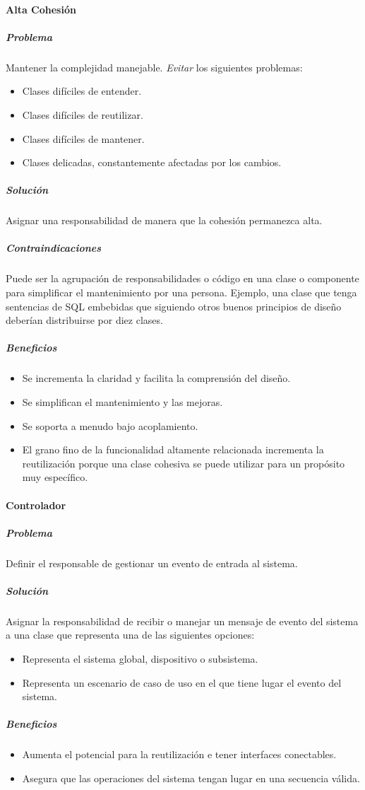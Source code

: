 \paragraph{Alta Cohesión}
\subparagraph{Problema}
Mantener la complejidad manejable. \emph{Evitar} los siguientes problemas:
\begin{itemize}
\item Clases difíciles de entender.
\item Clases difíciles de reutilizar.
\item Clases difíciles de mantener.
\item Clases delicadas, constantemente afectadas por los cambios.
\end{itemize}
\subparagraph{Solución}
Asignar una responsabilidad de manera que la cohesión permanezca alta.
\subparagraph{Contraindicaciones}
Puede ser la agrupación de responsabilidades o código en una clase o componente para simplificar el mantenimiento por una persona. Ejemplo, una clase que tenga sentencias de SQL embebidas que siguiendo otros buenos principios de diseño deberían distribuirse por diez clases.
\subparagraph{Beneficios}
\begin{itemize}
\item Se incrementa la claridad y facilita la comprensión del diseño.
\item Se simplifican el mantenimiento y las mejoras.
\item Se soporta a menudo bajo acoplamiento.
\item El grano fino de la funcionalidad altamente relacionada incrementa la reutilización porque una clase cohesiva se puede utilizar para un propósito muy específico.
\end{itemize}
\paragraph{Controlador}
\subparagraph{Problema}
Definir el responsable de gestionar un evento de entrada al sistema.
\subparagraph{Solución}
Asignar la responsabilidad de recibir o manejar un mensaje de evento del sistema a una clase que representa una de las siguientes opciones:
\begin{itemize}
\item Representa el sistema global, dispositivo o subsistema.
\item Representa un escenario de caso de uso en el que tiene lugar el evento del sistema.
\end{itemize}
\subparagraph{Beneficios}
\begin{itemize}
\item Aumenta el potencial para la reutilización e tener interfaces conectables.
\item Asegura que las operaciones del sistema tengan lugar en una secuencia válida.
\end{itemize}
